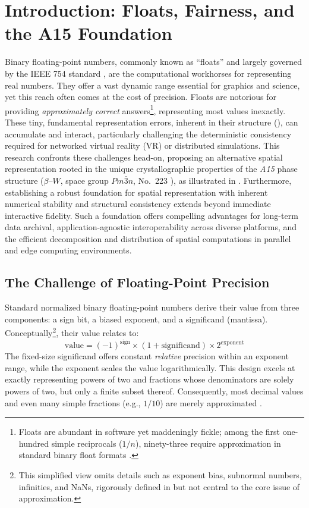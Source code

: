 \documentclass[10pt]{article}
\def\AAAB{\textit{A15}}
\def\betaW{$\beta$--$W$}
\begin{document}
\section{Introduction: Floats, Fairness, and the A15 Foundation}\label{sec-introduction}

Binary floating-point numbers, commonly known as ``floats'' and largely governed by the IEEE 754 standard \cite{IEEE754-2019}, are the computational workhorses for representing real numbers. They offer a vast dynamic range essential for graphics and science, yet this reach often comes at the cost of precision. Floats are notorious for providing \emph{approximately correct} answers\footnote{Floats are abundant in software yet maddeningly fickle; among the first one-hundred simple reciprocals ($1/n$), ninety-three require approximation in standard binary float formats \cite{Goldberg1991}.}, representing most values inexactly. These tiny, fundamental representation errors, inherent in their structure (), can accumulate and interact, particularly challenging the deterministic consistency required for networked virtual reality (VR) or distributed simulations. This research confronts these challenges head-on, proposing an alternative spatial representation rooted in the unique crystallographic properties of the \AAAB{} phase structure (\betaW{}, space group $Pm\bar{3}n$, No.~223 \cite{ITCVolumeA2016}), as illustrated in . Furthermore, establishing a robust foundation for spatial representation with inherent numerical stability and structural consistency extends beyond immediate interactive fidelity. Such a foundation offers compelling advantages for long-term data archival, application-agnostic interoperability across diverse platforms, and the efficient decomposition and distribution of spatial computations in parallel and edge computing environments.

\subsection{The Challenge of Floating-Point Precision}\label{subsec-intro-floats}

Standard normalized binary floating-point numbers derive their value from three components: a sign bit, a biased exponent, and a significand (mantissa). Conceptually\footnote{This simplified view omits details such as exponent bias, subnormal numbers, infinities, and NaNs, rigorously defined in \cite{IEEE754-2019} but not central to the core issue of approximation.}, their value relates to:
\begin{equation} \label{eq-float-representation}
    \text{value} = (-1)^{\text{sign}} \times (1 + \text{significand}) \times 2^{\text{exponent}}
\end{equation}
The fixed-size significand offers constant \emph{relative} precision within an exponent range, while the exponent scales the value logarithmically. This design excels at exactly representing powers of two and fractions whose denominators are solely powers of two, but only a finite subset thereof. Consequently, most decimal values and even many simple fractions (e.g., $1/10$) are merely approximated \cite{Goldberg1991}.
\end{document}
